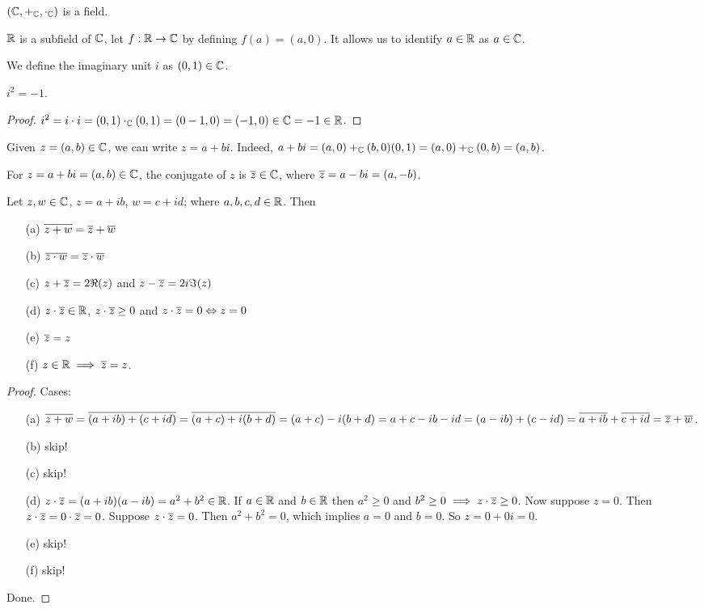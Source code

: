 \documentclass[]{article}
\begin{document}
\begin{recall}
	$(\mathbb{C},+_{\mathbb{C}},\cdot_{\mathbb{C}})$ is a field.
\end{recall}
\begin{note}
	$\mathbb{R}$ is a subfield of $\mathbb{C}$, let $f:\mathbb{R}\rightarrow \mathbb{C}$ by defining $f(a) = (a,0)$. It allows us to identify $a\in\mathbb{R}$ as $a\in\mathbb{C}$.
\end{note}
\begin{definition}
	[$i$] We define the imaginary unit $i$ as $(0,1)\in\mathbb{C}$.
\end{definition}
\begin{theorem}
	$i^2 = -1$.
\end{theorem}
\begin{proof}
	$i^2 = i\cdot i = (0,1)\cdot_{\mathbb{C}}(0,1) = (0-1,0) = (-1,0)\in\mathbb{C} = -1\in\mathbb{R}$.
\end{proof}
Given $z=(a,b)\in\mathbb{C}$, we can write $z = a+bi$. Indeed, $a+bi = (a,0) +_{\mathbb{C}} (b,0)(0,1) = (a,0)+_{\mathbb{C}}(0,b) = (a,b)$.
\begin{definition}
	[Conjugate] For $z = a+bi = (a,b)\in\mathbb{C}$, the conjugate of $z$ is $\overline{z}\in\mathbb{C}$, where $\overline{z} = a-bi = (a,-b)$.
\end{definition}
\begin{theorem}
	[Conjugate] Let $z,w\in\mathbb{C}$, $z = a+ib$, $w = c+id$; where $a,b,c,d\in\mathbb{R}$. Then
	\begin{enumerate}
		\item[(a)] $\overline{z+w} = \overline{z}+\overline{w}$
		\item[(b)] $\overline{z\cdot w} = \overline{z}\cdot \overline{w}$
		\item[(c)] $z+\overline{z} = 2\Re(z)$ and $z-\overline{z} = 2i\Im(z)$
		\item[(d)] $z\cdot \overline{z}\in\mathbb{R}$, $z\cdot \overline{z} \geq 0$ and $z\cdot\overline{z} = 0 \Leftrightarrow z = 0$
		\item[(e)] $\overline{z} = z$
		\item[(f)] $z\in\mathbb{R} \implies \overline{z} = z$.
	\end{enumerate}
\end{theorem}
\begin{proof}
	Cases:
	\begin{enumerate}
		\item[(a)] $\overline{z+w} = \overline{(a+ib)+(c+id)} = \overline{(a+c)+i(b+d)} = (a+c)-i(b+d) = a+c-ib-id = (a-ib)+(c-id) = \overline{a+ib} + \overline{c+id} = \overline{z} + \overline{w}$.
		\item[(b)] skip!
		\item[(c)] skip!
		\item[(d)] $z\cdot \overline{z} = (a+ib)(a-ib) = a^2+b^2\in\mathbb{R}$. If $a\in\mathbb{R}$ and $b\in\mathbb{R}$ then $a^2\geq 0$ and $b^2\geq 0 \implies z\cdot \overline{z} \geq 0$. Now suppose $z = 0$. Then $z\cdot \overline{z} = 0\cdot \overline{z} = 0$. Suppose $z\cdot \overline{z} = 0$. Then $a^2+b^2 = 0$, which implies $a=0$ and $b=0$. So $z = 0+0i = 0$.
		\item[(e)] skip!
		\item[(f)] skip!
	\end{enumerate}
	Done.
\end{proof}
\end{document}
